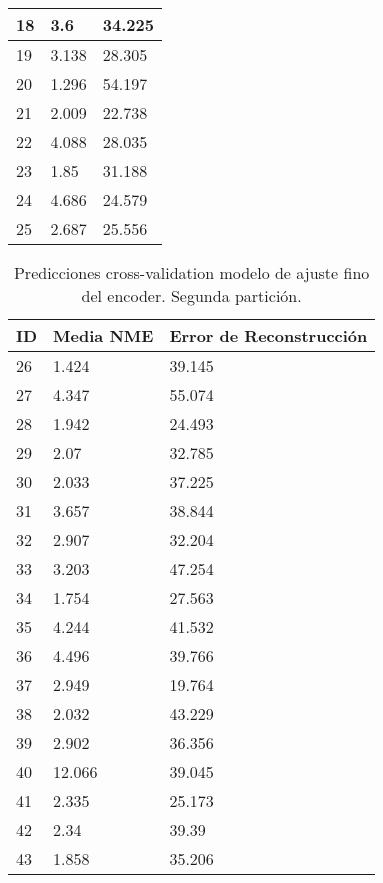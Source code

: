 \begin{table}[!ht]
\begin{tabular}{|l|l|l|}
        18 & 3.6 & 34.225 \\ \hline
        19 & 3.138 & 28.305 \\ \hline
        20 & 1.296 & 54.197 \\ \hline
        21 & 2.009 & 22.738 \\ \hline
        22 & 4.088 & 28.035 \\ \hline
        23 & 1.85 & 31.188 \\ \hline
        24 & 4.686 & 24.579 \\ \hline
        25 & 2.687 & 25.556 \\ \hline
    \end{tabular}
\end{table}

\begin{table}[!ht]
    \centering
    \caption{Predicciones cross-validation modelo de ajuste fino del encoder. Segunda partición.}
    \begin{tabular}{|l|l|l|}
    \hline
    \cellcolor{gray!25}\textbf{ID} & \cellcolor{gray!25}\textbf{Media NME} & \cellcolor{gray!25}\textbf{Error de Reconstrucción} \\ \hline
        26 & 1.424 & 39.145 \\ \hline
        27 & 4.347 & 55.074 \\ \hline
        28 & 1.942 & 24.493 \\ \hline
        29 & 2.07 & 32.785 \\ \hline
        30 & 2.033 & 37.225 \\ \hline
        31 & 3.657 & 38.844 \\ \hline
        32 & 2.907 & 32.204 \\ \hline
        33 & 3.203 & 47.254 \\ \hline
        34 & 1.754 & 27.563 \\ \hline
        35 & 4.244 & 41.532 \\ \hline
        36 & 4.496 & 39.766 \\ \hline
        37 & 2.949 & 19.764 \\ \hline
        38 & 2.032 & 43.229 \\ \hline
        39 & 2.902 & 36.356 \\ \hline
        40 & 12.066 & 39.045 \\ \hline
        41 & 2.335 & 25.173 \\ \hline
        42 & 2.34 & 39.39 \\ \hline
        43 & 1.858 & 35.206 \\ \hline

\end{tabular}
\end{table}
